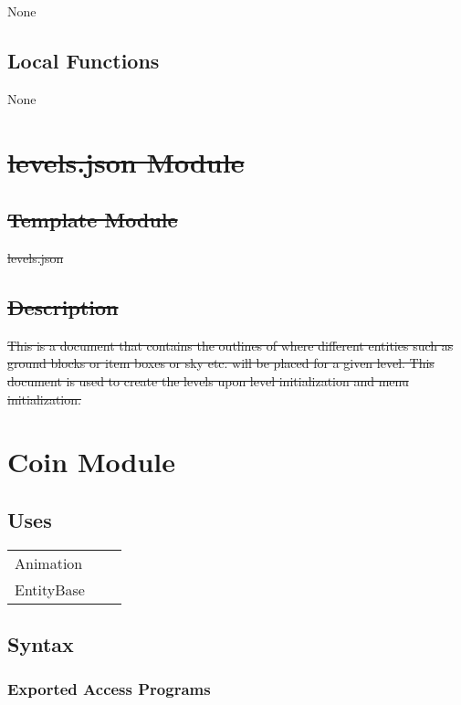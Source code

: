 \documentclass[12pt]{article}
\begin{document}
None

\subsection* {Local Functions}

None

\newpage

\section* {\sout{levels.json Module}}

\subsection*{\sout{Template Module}}

\sout{levels.json}

\subsection* {\sout{Description}}

\sout{This is a document that contains the outlines of where different entities such as ground blocks or item boxes or sky etc. will be placed for a given level. This document is used to create the levels upon level initialization and menu initialization.}

\newpage

\color{red}
\section*{Coin Module}

\subsection* {Uses}

\begin{tabular}{lll}
    Animation & & \\
    EntityBase & &
\end{tabular}

\subsection* {Syntax}

\subsubsection* {Exported Access Programs}
\end{document}
